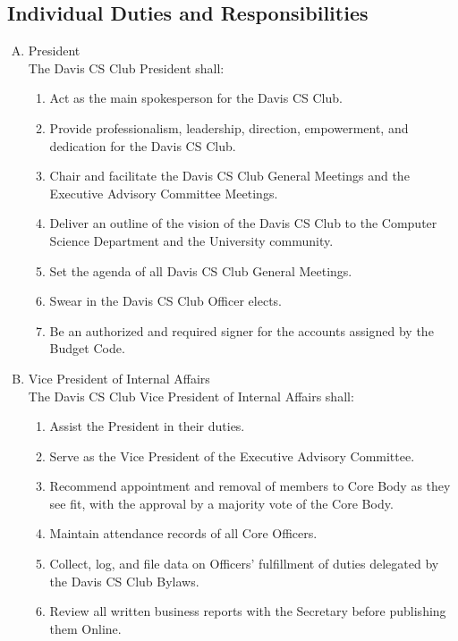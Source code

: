 \documentclass{article}
\newenvironment{li}{
\begin{enumerate}
  \setlength{\itemsep}{1pt}
  \setlength{\parskip}{0pt}
  \setlength{\parsep}{0pt}
}{\end{enumerate}}
\begin{document}
\subsection{Individual Duties and Responsibilities}
\begin{enumerate}[A.]
  \setlength{\itemsep}{1pt}
  \setlength{\parskip}{0pt}
  \setlength{\parsep}{0pt}
\item President\\
	The Davis CS Club President shall:
	\begin{li}
	\item Act as the main spokesperson for the Davis CS Club.
	\item Provide professionalism, leadership, direction, empowerment, and dedication for the Davis CS Club.
	\item Chair and facilitate the Davis CS Club General Meetings and the Executive Advisory Committee Meetings.
	\item Deliver an outline of the vision of the Davis CS Club to the Computer Science Department and the University community.
	\item Set the agenda of all Davis CS Club General Meetings.
	\item Swear in the Davis CS Club Officer elects.
	\item Be an authorized and required signer for the accounts assigned by the Budget Code.
	\end{li}
\item Vice President of Internal Affairs\\
	The Davis CS Club Vice President of Internal Affairs shall:
	\begin{li}
	\item Assist the President in their duties.
	\item Serve as the Vice President of the Executive Advisory Committee.
	\item Recommend appointment and removal of members to Core Body as they see fit, with the approval by a majority vote of the Core Body.
	\item Maintain attendance records of all Core Officers.
	\item Collect, log, and file data on Officers' fulfillment of duties delegated by the Davis CS Club Bylaws.
	\item Review all written business reports with the Secretary before publishing them Online.

\end{li}
\end{enumerate}
\end{document}
